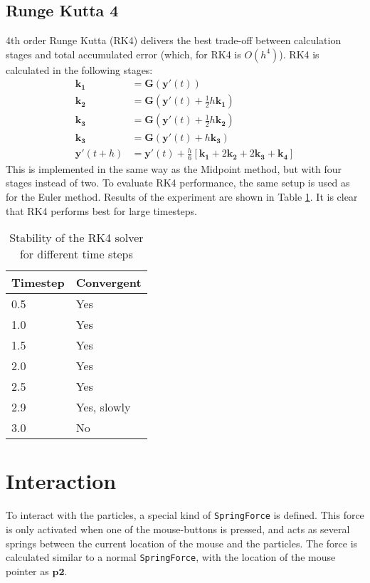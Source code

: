 \documentclass[a4paper,twoside,11pt,twocolumn]{article}
\begin{document}
\subsection{Runge Kutta 4}
4th order Runge Kutta (RK4) delivers the best trade-off between calculation stages and total accumulated error (which, for RK4 is $O(h^4)$). RK4 is calculated in the following stages:
\begin{align}
	\mathbf{k_1} &= \mathbf{G}(\mathbf{y}'(t))\\
	\mathbf{k_2} &= \mathbf{G}(\mathbf{y}'(t)+\frac{1}{2}h\mathbf{k_1})\\
	\mathbf{k_3} &= \mathbf{G}(\mathbf{y}'(t)+\frac{1}{2}h\mathbf{k_2})\\
	\mathbf{k_3} &= \mathbf{G}(\mathbf{y}'(t)+h\mathbf{k_3})\\
	\mathbf{y}'(t+h) &= \mathbf{y}'(t) + \frac{h}{6}[\mathbf{k_1}+2\mathbf{k_2}+2\mathbf{k_3}+\mathbf{k_4}]
\end{align}
This is implemented in the same way as the Midpoint method, but with four stages instead of two.
To evaluate RK4 performance, the same setup is used as for the Euler method. Results of the experiment are shown in Table \ref{RK4}. It is clear that RK4 performs best for large timesteps.
\begin{table}[h]
	\caption{Stability of the RK4 solver for different time steps}
	\label{RK4}
	\begin{tabular}{|l|l|}
		\hline
		\textbf{Timestep} & \textbf{Convergent} \\ \hline
		0.5               & Yes                 \\ \hline
		1.0               & Yes                 \\ \hline
		1.5               & Yes                 \\ \hline
		2.0               & Yes                 \\ \hline
		2.5               & Yes                 \\ \hline
		2.9               & Yes, slowly         \\ \hline
		3.0               & No                  \\ \hline
	\end{tabular}
\end{table}

\section{Interaction}
To interact with the particles, a special kind of \texttt{SpringForce} is defined. This force is only activated when one of the mouse-buttons is pressed, and acts as several springs between the current location of the mouse and the particles. The force is calculated similar to a normal \texttt{SpringForce}, with the location of the mouse pointer as $\mathbf{p2}$.
\end{document}
